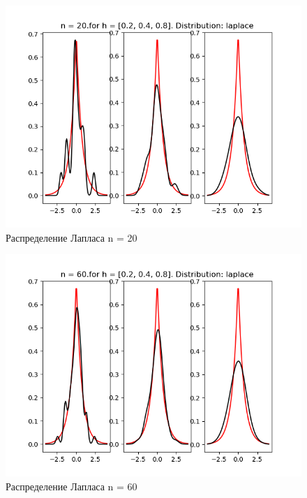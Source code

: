 \documentclass[a4]{article}
\begin{document}
\begin{center}
\begin{figure}[h!]
				\includegraphics[width=\textwidth]{laplaceker20.png}
				\caption[Распределение Лапласа n = 20]{Распределение Лапласа n = 20}
			\end{figure}
			\newpage
			\begin{figure}[h!]
				\includegraphics[width=\textwidth]{laplaceker60.png}
				\caption[Распределение Лапласа n = 60]{Распределение Лапласа n = 60}
			\end{figure}
			\newpage
			\begin{figure}[h!]

\end{figure}
\end{center}
\end{document}

